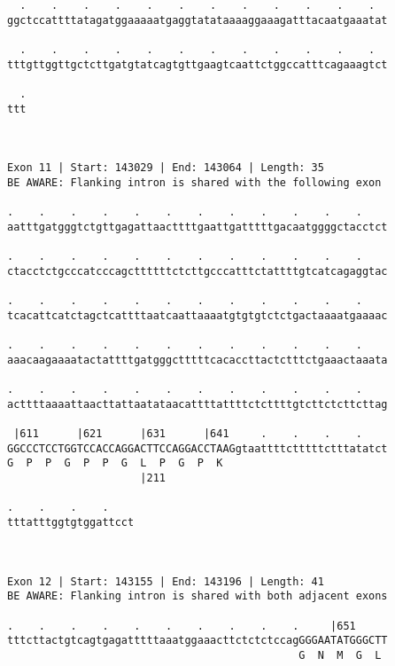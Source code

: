 \documentclass{article}
\begin{document}
\begin{Verbatim}
  .    .    .    .    .    .    .    .    .    .    .    .  
ggctccattttatagatggaaaaatgaggtatataaaaggaaagatttacaatgaaatat
                                                            
  .    .    .    .    .    .    .    .    .    .    .    .  
tttgttggttgctcttgatgtatcagtgttgaagtcaattctggccatttcagaaagtct
                                                            
  .
ttt
   
   
 
Exon 11 | Start: 143029 | End: 143064 | Length: 35
BE AWARE: Flanking intron is shared with the following exon
 
.    .    .    .    .    .    .    .    .    .    .    .    
aatttgatgggtctgttgagattaacttttgaattgatttttgacaatggggctacctct
                                                            
.    .    .    .    .    .    .    .    .    .    .    .    
ctacctctgcccatcccagcttttttctcttgcccatttctattttgtcatcagaggtac
                                                            
.    .    .    .    .    .    .    .    .    .    .    .    
tcacattcatctagctcattttaatcaattaaaatgtgtgtctctgactaaaatgaaaac
                                                            
.    .    .    .    .    .    .    .    .    .    .    .    
aaacaagaaaatactattttgatgggctttttcacaccttactctttctgaaactaaata
                                                            
.    .    .    .    .    .    .    .    .    .    .    .    
acttttaaaattaacttattaatataacattttattttctcttttgtcttctcttcttag
                                                            
 |611      |621      |631      |641     .    .    .    .    
GGCCCTCCTGGTCCACCAGGACTTCCAGGACCTAAGgtaattttctttttctttatatct
G  P  P  G  P  P  G  L  P  G  P  K                          
                     |211                                   
  
.    .    .    .    
tttatttggtgtggattcct
                    
                    
 
Exon 12 | Start: 143155 | End: 143196 | Length: 41
BE AWARE: Flanking intron is shared with both adjacent exons
 
.    .    .    .    .    .    .    .    .    .     |651     
tttcttactgtcagtgagatttttaaatggaaacttctctctccagGGGAATATGGGCTT
                                              G  N  M  G  L 
                                                            

\end{Verbatim}
\end{document}

